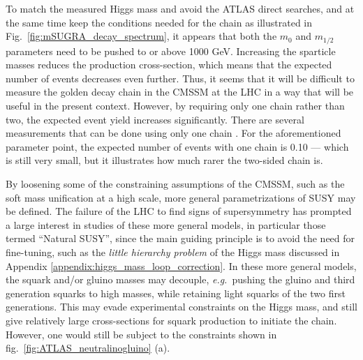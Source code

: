 \documentclass[twoside,english]{uiofysmaster}
\begin{document}

To match the measured Higgs mass and avoid the ATLAS direct searches, and at the same time keep the conditions needed for the chain as illustrated in Fig.\ \ref{fig:mSUGRA_decay_spectrum}, it appears that both the $m_0$ and $m_{1/2}$ parameters need to be pushed to or above 1000 GeV. Increasing the sparticle masses reduces the production cross-section, which means that the expected number of events decreases even further. Thus, it seems that it will be difficult to measure the golden decay chain in the CMSSM at the LHC in a way that will be useful in the present context. However, by requiring only one chain rather than two, the expected event yield increases significantly. There are several measurements that can be done using only one chain \cite{Miller:2005zp}. For the aforementioned parameter point, the expected number of events with one chain is 0.10 --- which is still very small, but it illustrates how much rarer the two-sided chain is.

By loosening some of the constraining assumptions of the CMSSM, such as the soft mass unification at a high scale, more general parametrizations of SUSY may be defined. The failure of the LHC to find signs of supersymmetry has prompted a large interest in studies of these more general models, in particular those  termed ``Natural SUSY'', since the main guiding principle is to avoid the need for fine-tuning, such as the {\it little hierarchy problem} of the Higgs mass discussed in Appendix \ref{appendix:higgs_mass_loop_correction}. In these more general models, the squark and/or gluino masses may decouple, {\it e.g.}\ pushing the gluino and third generation squarks to high masses, while retaining light squarks of the two first generations. This may evade experimental constraints on the Higgs mass, and still give relatively large cross-sections for squark production to initiate the chain. However, one would still be subject to the constraints shown in fig.~\ref{fig:ATLAS_neutralinogluino} (a). 
\end{document}
